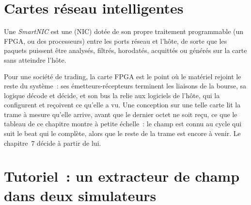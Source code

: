 \section{Cartes réseau intelligentes}

\begin{definition}[SmartNIC]\label{def:nw:programmable-hardware-i-architecture-and-toolchain:smartnic}
Une \emph{SmartNIC} est une  (NIC) dotée de son propre traitement programmable (un FPGA, ou des processeurs) entre les
ports réseau et l'hôte, de sorte que les paquets puissent être analysés, filtrés, horodatés, acquittés ou générés sur la carte sans atteindre
l'hôte.
\end{definition}

Pour une société de trading, la carte FPGA est le point où le matériel rejoint le reste du système~: ses émetteurs-récepteurs terminent les liaisons de la bourse, sa
logique décode et décide, et son bus la relie aux logiciels de l'hôte, qui la configurent et reçoivent ce qu'elle a vu. Une conception
sur une telle carte lit la trame à mesure qu'elle arrive, avant que le dernier octet ne soit reçu, ce que le tableau de ce chapitre montre à petite échelle~:
le champ est connu au cycle qui suit le beat qui le complète, alors que le reste de la trame est encore à venir. Le chapitre~7 décide à partir de lui.

\section{Tutoriel~: un extracteur de champ dans deux simulateurs}\label{tut:nw:programmable-hardware-i-architecture-and-toolchain:tut}

